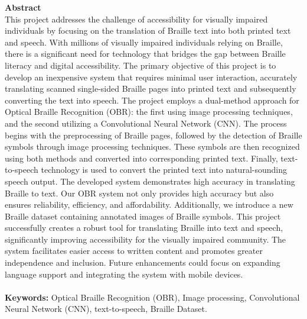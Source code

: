 \textbf{\large Abstract}\\

This project addresses the challenge of accessibility for visually impaired individuals by focusing on the translation of Braille text into both printed text and speech. With millions of visually impaired individuals relying on Braille, there is a significant need for technology that bridges the gap between Braille literacy and digital accessibility. The primary objective of this project is to develop an inexpensive system that requires minimal user interaction, accurately translating scanned single-sided Braille pages into printed text and subsequently converting the text into speech. The project employs a dual-method approach for Optical Braille Recognition (OBR): the first using image processing techniques, and the second utilizing a Convolutional Neural Network (CNN). The process begins with the preprocessing of Braille pages, followed by the detection of Braille symbols through image processing techniques. These symbols are then recognized using both methods and converted into corresponding printed text. Finally, text-to-speech technology is used to convert the printed text into natural-sounding speech output. The developed system demonstrates high accuracy in translating Braille to text.  Our OBR system not only provides high accuracy but also ensures reliability, efficiency, and affordability. Additionally, we introduce a new Braille dataset containing annotated images of Braille symbols. This project successfully creates a robust tool for translating Braille into text and speech, significantly improving accessibility for the visually impaired community. The system facilitates easier access to written content and promotes greater independence and inclusion. Future enhancements could focus on expanding language support and integrating the system with mobile devices. \\
\\ \textbf{Keywords:} Optical Braille Recognition (OBR), Image processing, Convolutional Neural Network (CNN), text-to-speech, Braille Dataset.

